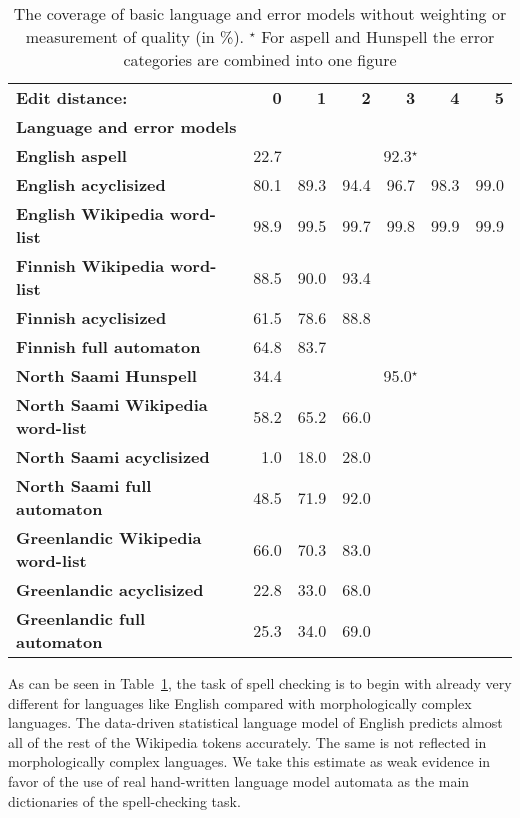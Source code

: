 \documentclass[a4paper,12pt]{article}
\begin{document}
\begin{table}
    \centering
    \begin{tabular}{|l|r|r|r|r|r|r|}
        \hline
        \bf Edit distance: & \bf 0 & \bf 1 & \bf 2 & \bf 3 & \bf 4 & \bf 5 \\
        \bf Language and error models & & & & & & \\
        \hline
    \bf English aspell & 22.7 & \multicolumn{5}{|c|}{92.3$^\star$} \\
        \bf English acyclisized & 80.1 & 89.3 & 94.4 & 96.7 & 98.3 & 99.0 \\
            \bf English Wikipedia word-list & 98.9 & 99.5 & 99.7 & 99.8 & 99.9 & 99.9 \\
        \hline
                   \bf Finnish Wikipedia word-list & 88.5 & 90.0 & 93.4 & & & \\
                  \bf Finnish acyclisized & 61.5 & 78.6 & 88.8 & & & \\
                  \bf Finnish full automaton & 64.8 & 83.7 & & & & \\
        \hline
        \bf North Saami Hunspell & 34.4 & \multicolumn{5}{|c|}{95.0$^\star$} \\
        \bf North Saami Wikipedia word-list & 58.2 & 65.2 & 66.0 & & & \\
               \bf North Saami acyclisized & 1.0 & 18.0 & 28.0 & & & \\
               \bf North Saami full automaton & 48.5 & 71.9 & 92.0 & & & \\
        \hline
        \bf Greenlandic Wikipedia word-list & 66.0 & 70.3 & 83.0 & & & \\
                 \bf Greenlandic acyclisized & 22.8 & 33.0 & 68.0 & & & \\
                  \bf Greenlandic full automaton & 25.3 & 34.0 & 69.0 & & & \\
        \hline
    \end{tabular}
    \caption{The coverage of basic language and error models without weighting
        or measurement of quality (in \%).
    $^\star$ For aspell and Hunspell the error categories are combined into one
    figure\label{table:coverage}}
\end{table}

As can be seen in Table~\ref{table:coverage}, the task of spell checking is to
begin with already very different for languages like English compared
with morphologically complex languages. The data-driven statistical language
model of English predicts almost all of the rest of the Wikipedia tokens
accurately. The same is not reflected in morphologically complex languages. We
take this estimate as weak evidence in favor of the use of real hand-written
language model automata as the main dictionaries of the spell-checking task.
\end{document}

